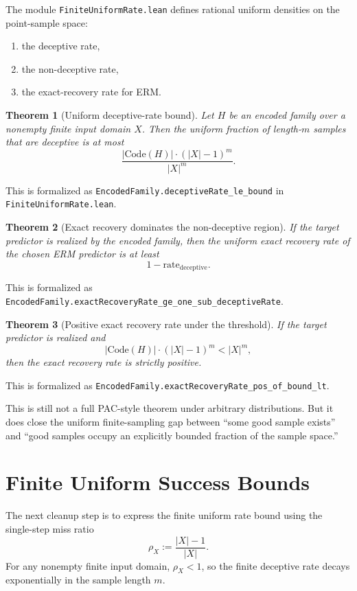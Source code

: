 \documentclass[11pt]{article}
\newtheorem{theorem}{Theorem}[section]
\theoremstyle{remark}
\begin{document}
The module \texttt{FiniteUniformRate.lean} defines rational uniform densities on
the point-sample space:
\begin{enumerate}[leftmargin=1.5em]
  \item the deceptive rate,
  \item the non-deceptive rate,
  \item the exact-recovery rate for ERM.
\end{enumerate}

\begin{theorem}[Uniform deceptive-rate bound]
Let \(H\) be an encoded family over a nonempty finite input domain \(X\).  Then
the uniform fraction of length-\(m\) samples that are deceptive is at most
\[
  \frac{|\mathrm{Code}(H)| \cdot (|X|-1)^m}{|X|^m}.
\]
\end{theorem}

\noindent
This is formalized as
\texttt{EncodedFamily.deceptiveRate\_le\_bound} in
\texttt{FiniteUniformRate.lean}.

\begin{theorem}[Exact recovery dominates the non-deceptive region]
If the target predictor is realized by the encoded family, then the uniform exact
recovery rate of the chosen ERM predictor is at least
\[
  1 - \mathrm{rate}_{\mathrm{deceptive}}.
\]
\end{theorem}

\noindent
This is formalized as
\texttt{EncodedFamily.exactRecoveryRate\_ge\_one\_sub\_deceptiveRate}.

\begin{theorem}[Positive exact recovery rate under the threshold]
If the target predictor is realized and
\[
  |\mathrm{Code}(H)| \cdot (|X|-1)^m < |X|^m,
\]
then the exact recovery rate is strictly positive.
\end{theorem}

\noindent
This is formalized as
\texttt{EncodedFamily.exactRecoveryRate\_pos\_of\_bound\_lt}.

This is still not a full PAC-style theorem under arbitrary distributions.  But it
does close the uniform finite-sampling gap between ``some good sample exists'' and
``good samples occupy an explicitly bounded fraction of the sample space.''

\section{Finite Uniform Success Bounds}

The next cleanup step is to express the finite uniform rate bound using the
single-step miss ratio
\[
  \rho_X := \frac{|X|-1}{|X|}.
\]
For any nonempty finite input domain, \(\rho_X < 1\), so the finite deceptive
rate decays exponentially in the sample length \(m\).
\end{document}
